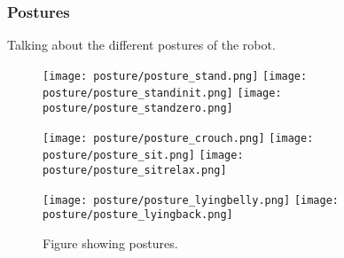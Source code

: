 \subsubsection{Postures}
Talking about the different postures of the robot.

\begin{figure}
\centerline{\texttt{[image: posture/posture\_stand.png]}
            \texttt{[image: posture/posture\_standinit.png]}
            \texttt{[image: posture/posture\_standzero.png]}
}
\vspace*{0.05in}
\centerline{\texttt{[image: posture/posture\_crouch.png]}
            \texttt{[image: posture/posture\_sit.png]}
            \texttt{[image: posture/posture\_sitrelax.png]}
}
\vspace*{0.05in}
\centerline{\texttt{[image: posture/posture\_lyingbelly.png]}
            \texttt{[image: posture/posture\_lyingback.png]}
}
\caption{Figure showing postures.}
\label{fig:nao_postures1}
\end{figure}
